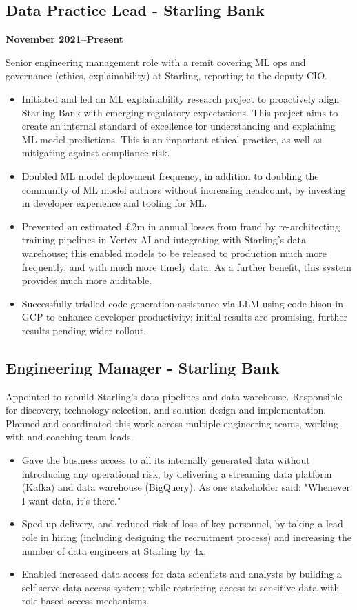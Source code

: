 \documentclass[a4paper]{scrartcl}
\begin{document}
\subsection*{Data Practice Lead - Starling Bank}
\textbf{November 2021--Present}

Senior engineering management role with a remit covering ML ops and governance (ethics,
explainability) at Starling, reporting to the deputy CIO.
\begin{itemize}
	\item Initiated and led an ML explainability research project to proactively align Starling Bank with emerging regulatory expectations. This project aims to create an internal standard of excellence for understanding and explaining ML model predictions. This is an important ethical practice, as well as mitigating against compliance risk.
	\item Doubled ML model deployment frequency, in addition to doubling the community of ML model authors without increasing headcount, by investing in developer experience and tooling for ML.
	\item Prevented an estimated £2m in annual losses from fraud by re-architecting training pipelines in Vertex AI and integrating with Starling's data warehouse; this enabled models to be released to production much more frequently, and with much more timely data. As a further benefit, this system provides much more auditable.
	\item Successfully trialled code generation assistance via LLM using code-bison in GCP to enhance developer productivity; initial results are promising, further results pending wider rollout.
\end{itemize}

\subsection*{Engineering Manager - Starling Bank}

Appointed to rebuild Starling's data pipelines and data warehouse. Responsible for discovery, technology selection, and solution design and implementation. Planned and coordinated this work across multiple engineering teams, working with and coaching team leads.
\begin{itemize}
	\item Gave the business access to all its internally generated data without introducing any operational risk, by delivering a streaming data platform (Kafka) and data warehouse (BigQuery). As one stakeholder said: "Whenever I want data, it's there."
	\item Sped up delivery, and reduced risk of loss of key personnel, by taking a lead role in hiring (including designing the recruitment process) and increasing the number of data engineers at Starling by 4x.
	\item Enabled increased data access for data scientists and analysts by building a self-serve data access system; while restricting access to sensitive data with role-based access mechanisms.
\end{itemize}
\end{document}
